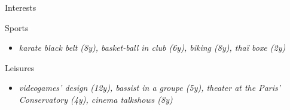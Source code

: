 \vspace{4mm}
\hspace*{-2mm}
{\fontsize{16}{10}\selectfont \hspace{1.5mm} Interests}
\newline \newline

\vspace{-8mm}
\hspace{-2mm}
{\fontsize{12}{10}\selectfont \hspace{3.8mm} Sports}\newline
\vspace{-6mm}
\begin{itemize}
    \item[\tiny\ding{110}] \textit{karate black belt (8y), basket-ball in club (6y), biking (8y), thaï boxe (2y)}
\end{itemize}

\hspace{-2mm}
\vspace{-6mm}
{\fontsize{12}{10}\selectfont \hspace{3.8mm} Leisures}\newline
\begin{itemize}
    \item[\tiny\ding{110}] \textit{videogames' design (12y), bassist in a groupe (5y), theater at the Paris' Conservatory (4y), cinema talkshows (8y)}
\end{itemize}
